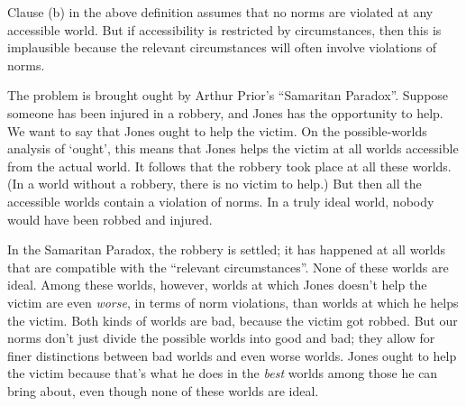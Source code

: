 


Clause (b) in the above definition assumes that no norms are violated at any
accessible world. But if accessibility is restricted by circumstances, then this
is implausible because the relevant circumstances will often involve violations of
norms.

The problem is brought ought by Arthur Prior's ``Samaritan Paradox''.  Suppose
someone has been injured in a robbery, and Jones has the opportunity to help. We
want to say that Jones ought to help the victim. On the possible-worlds analysis
of `ought', this means that Jones helps the victim at all worlds accessible from
the actual world. It follows that the robbery took place at all these
worlds. (In a world without a robbery, there is no victim to help.)  But then
all the accessible worlds contain a violation of norms. In a truly ideal world,
nobody would have been robbed and injured.

In the Samaritan Paradox, the robbery is settled; it has happened at all worlds
that are compatible with the ``relevant circumstances''. None of these worlds
are ideal. Among these worlds, however, worlds at which Jones doesn't help the
victim are even \emph{worse}, in terms of norm violations, than worlds at which
he helps the victim. Both kinds of worlds are bad, because the victim got
robbed. But our norms don't just divide the possible worlds into good and bad;
they allow for finer distinctions between bad worlds and even worse worlds.
Jones ought to help the victim because that's what he does in the \emph{best}
worlds among those he can bring about, even though none of these worlds are
ideal.

